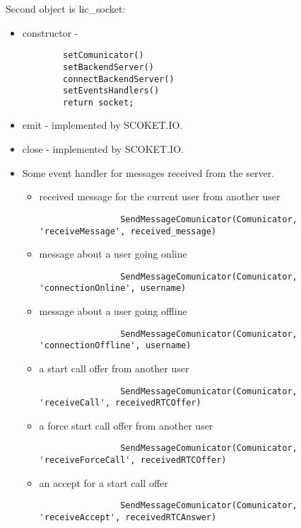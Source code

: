 Second object is lic_socket:
\begin{itemize}
    \item constructor - 
    \begin{lstlisting}
        setComunicator()
        setBackendServer()
        connectBackendServer()
        setEventsHandlers()
        return socket;
    \end{lstlisting}
    \item emit - implemented by SCOKET.IO.
    \item close - implemented by SCOKET.IO.
    \item Some event handler for messages received from the server.
        \begin{itemize}
            \item received message for the current user from another user
            \begin{lstlisting}
                SendMessageComunicator(Comunicator, 'receiveMessage', received_message)
            \end{lstlisting}
            \item message about a user going online
            \begin{lstlisting}
                SendMessageComunicator(Comunicator, 'connectionOnline', username)
            \end{lstlisting}
            \item message about a user going offline
            \begin{lstlisting}
                SendMessageComunicator(Comunicator, 'connectionOffline', username)
            \end{lstlisting}
            \item a start call offer from another user
            \begin{lstlisting}
                SendMessageComunicator(Comunicator, 'receiveCall', receivedRTCOffer)
            \end{lstlisting}
            \item a force start call offer from another user
            \begin{lstlisting}
                SendMessageComunicator(Comunicator, 'receiveForceCall', receivedRTCOffer)
            \end{lstlisting}
            \item an accept for a start call offer
            \begin{lstlisting}
                SendMessageComunicator(Comunicator, 'receiveAccept', receivedRTCAnswer)

\end{lstlisting}
\end{itemize}
\end{itemize}
